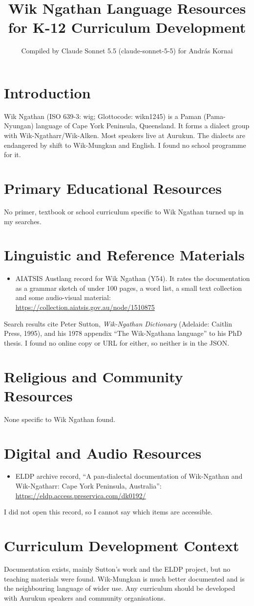 \documentclass[12pt]{article}
\title{Wik Ngathan Language Resources for K-12 Curriculum Development}
\author{Compiled by Claude Sonnet 5.5 (claude-sonnet-5-5) for Andr\'as Kornai}
\date{}
\begin{document}
\maketitle

\section{Introduction}
Wik Ngathan (ISO 639-3: wig; Glottocode: wikn1245) is a Paman (Pama-Nyungan) language of Cape York Peninsula, Queensland. It forms a dialect group with Wik-Ngatharr/Wik-Alken. Most speakers live at Aurukun. The dialects are endangered by shift to Wik-Mungkan and English. I found no school programme for it.

\section{Primary Educational Resources}
No primer, textbook or school curriculum specific to Wik Ngathan turned up in my searches.

\section{Linguistic and Reference Materials}
\begin{itemize}
\item AIATSIS Austlang record for Wik Ngathan (Y54). It rates the documentation as a grammar sketch of under 100 pages, a word list, a small text collection and some audio-visual material: \url{https://collection.aiatsis.gov.au/node/1510875}
\end{itemize}
Search results cite Peter Sutton, \emph{Wik-Ngathan Dictionary} (Adelaide: Caitlin Press, 1995), and his 1978 appendix ``The Wik-Ngathana language'' to his PhD thesis. I found no online copy or URL for either, so neither is in the JSON.

\section{Religious and Community Resources}
None specific to Wik Ngathan found.

\section{Digital and Audio Resources}
\begin{itemize}
\item ELDP archive record, ``A pan-dialectal documentation of Wik-Ngathan and Wik-Ngatharr: Cape York Peninsula, Australia'': \url{https://eldp.access.preservica.com/dk0192/}
\end{itemize}
I did not open this record, so I cannot say which items are accessible.

\section{Curriculum Development Context}
Documentation exists, mainly Sutton's work and the ELDP project, but no teaching materials were found. Wik-Mungkan is much better documented and is the neighbouring language of wider use. Any curriculum should be developed with Aurukun speakers and community organisations.
\end{document}
